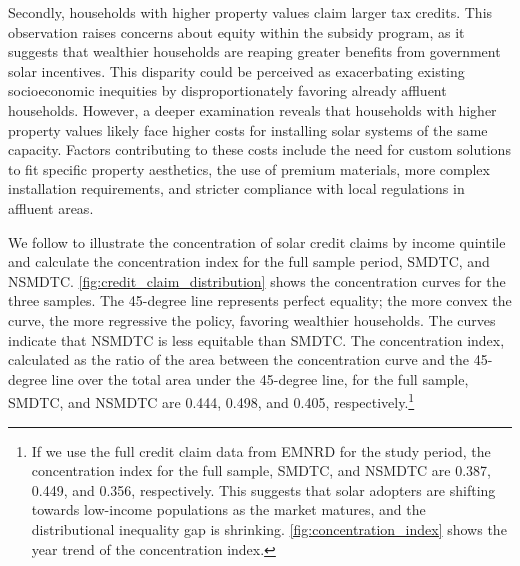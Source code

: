 \documentclass[11pt,twoside,letterpaper]{article}
\begin{document}
Secondly, households with higher property values claim larger tax credits. This observation raises concerns about equity within the subsidy program, as it suggests that wealthier households are reaping greater benefits from government solar incentives. This disparity could be perceived as exacerbating existing socioeconomic inequities by disproportionately favoring already affluent households. However, a deeper examination reveals that households with higher property values likely face higher costs for installing solar systems of the same capacity. Factors contributing to these costs include the need for custom solutions to fit specific property aesthetics, the use of premium materials, more complex installation requirements, and stricter compliance with local regulations in affluent areas. 


We follow \textcite{borenstein_distributional_2016} to illustrate the concentration of solar credit claims by income quintile and calculate the concentration index for the full sample period, SMDTC, and NSMDTC. \autoref{fig:credit_claim_distribution} shows the concentration curves for the three samples. The 45-degree line represents perfect equality; the more convex the curve, the more regressive the policy, favoring wealthier households. The curves indicate that NSMDTC is less equitable than SMDTC. The concentration index, calculated as the ratio of the area between the concentration curve and the 45-degree line over the total area under the 45-degree line, for the full sample, SMDTC, and NSMDTC are 0.444, 0.498, and 0.405, respectively.\footnote{If we use the full credit claim data from EMNRD for the study period, the concentration index for the full sample, SMDTC, and NSMDTC are 0.387, 0.449, and 0.356, respectively. This suggests that solar adopters are shifting towards low-income populations as the market matures, and the distributional inequality gap is shrinking. \autoref{fig:concentration_index} shows the year trend of the concentration index.}%
\end{document}
